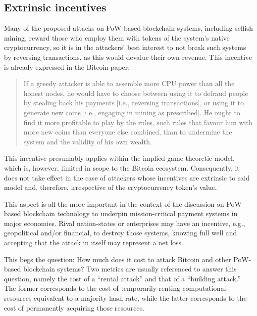 \subsection{Extrinsic incentives}

Many of the proposed attacks on PoW-based blockchain systems, including selfish mining, reward those who employ them with tokens of the system's native cryptocurrency, so it is in the attackers' best interest to not break such systems by reversing transactions, as this would devalue their own revenue.
This incentive is already expressed in the Bitcoin paper: \autocite[4]{bitcoin2008paper}

\begin{quote}
	If a greedy attacker is able to assemble more CPU power than all the honest nodes, he would have to choose between using it to defraud people by stealing back his payments [i.e., reversing transactions], or using it to generate new coins [i.e., engaging in mining as prescribed].
	He ought to find it more profitable to play by the rules, such rules that favour him with more new coins than everyone else combined, than to undermine the system and the validity of his own wealth.
\end{quote}

This incentive presumably applies within the implied game-theoretic model, which is, however, limited in scope to the Bitcoin ecosystem.
Consequently, it does not take effect in the case of attackers whose incentives are extrinsic to said model and, therefore, irrespective of the cryptocurrency token's value.

This aspect is all the more important in the context of the discussion on PoW-based blockchain technology to underpin mission-critical payment systems in major economies.
Rival nation-states or enterprises may have an incentive, e.g., geopolitical and/or financial, to destroy those systems, knowing full well and accepting that the attack in itself may represent a net loss.

This begs the question:
How much does it cost to attack Bitcoin and other PoW-based blockchain systems?
Two metrics are usually referenced to answer this question, namely the cost of a ``rental attack'' and that of a ``building attack.''
The former corresponds to the cost of temporarily renting computational resources equivalent to a majority hash rate, while the latter corresponds to the cost of permanently acquiring those resources.

